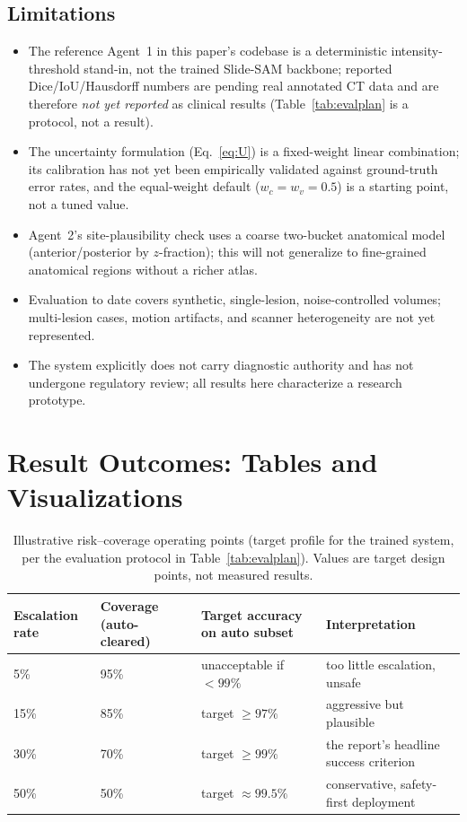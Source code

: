 \documentclass[11pt,a4paper]{article}
\begin{document}
\subsection{Limitations}
\begin{itemize}[leftmargin=1.4em]
    \item The reference Agent~1 in this paper's codebase is a deterministic intensity-threshold stand-in, not the trained Slide-SAM backbone; reported Dice/IoU/Hausdorff numbers are pending real annotated CT data and are therefore \emph{not yet reported} as clinical results (Table~\ref{tab:evalplan} is a protocol, not a result).
    \item The uncertainty formulation (Eq.~\ref{eq:U}) is a fixed-weight linear combination; its calibration has not yet been empirically validated against ground-truth error rates, and the equal-weight default ($w_c=w_v=0.5$) is a starting point, not a tuned value.
    \item Agent~2's site-plausibility check uses a coarse two-bucket anatomical model (anterior/posterior by $z$-fraction); this will not generalize to fine-grained anatomical regions without a richer atlas.
    \item Evaluation to date covers synthetic, single-lesion, noise-controlled volumes; multi-lesion cases, motion artifacts, and scanner heterogeneity are not yet represented.
    \item The system explicitly does not carry diagnostic authority and has not undergone regulatory review; all results here characterize a research prototype.
\end{itemize}

\section{Result Outcomes: Tables and Visualizations}
\label{sec:outcomes}

\begin{table}[htbp]
\centering
\caption{Illustrative risk--coverage operating points (target profile for the trained system, per the evaluation protocol in Table~\ref{tab:evalplan}). Values are target design points, not measured results.}
\label{tab:riskcoverage}
\small
\begin{tabular}{p{2.0cm}p{2.6cm}p{3.0cm}p{5.3cm}}
\toprule
\textbf{Escalation rate} & \textbf{Coverage (auto-cleared)} & \textbf{Target accuracy on auto subset} & \textbf{Interpretation} \\
\midrule
5\% & 95\% & unacceptable if $<99\%$ & too little escalation, unsafe \\
15\% & 85\% & target $\ge 97\%$ & aggressive but plausible \\
30\% & 70\% & target $\ge 99\%$ & the report's headline success criterion \\
50\% & 50\% & target $\approx 99.5\%$ & conservative, safety-first deployment \\
\bottomrule
\end{tabular}
\end{table}
\end{document}
